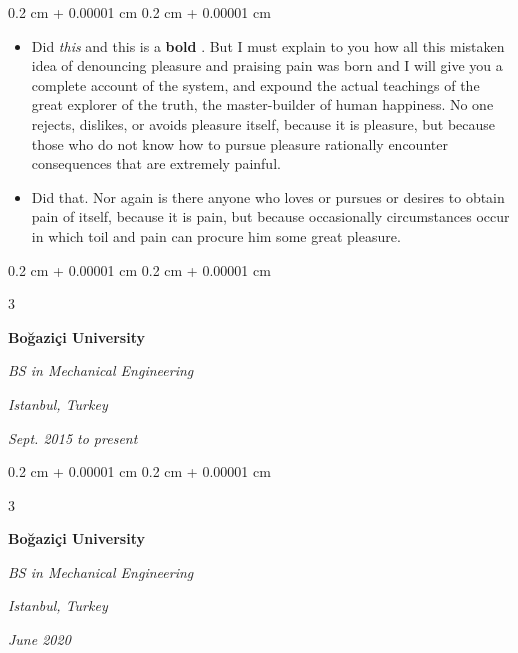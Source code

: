 \documentclass[10pt, letterpaper]{article}
\newenvironment{highlights}{
    \begin{itemize}[
        topsep=0.10 cm,
        parsep=0.10 cm,
        partopsep=0pt,
        itemsep=0pt,
        leftmargin=0.4 cm + 10pt + 0.6 cm
    ]
}{
    \end{itemize}
} %
\newenvironment{onecolentry}{
    \begin{adjustwidth}{
        0.2 cm + 0.00001 cm
    }{
        0.2 cm + 0.00001 cm
    }
}{
    \end{adjustwidth}
} %
\newenvironment{threecolentry}[3][]{
    \onecolentry
    \def\thirdColumn{#3}
    \setcolumnwidth{0.6 cm, \fill, 4.5 cm}
    \begin{paracol}{3}
    #2 \switchcolumn
}{
    \switchcolumn \raggedleft \thirdColumn
    \end{paracol}
    \endonecolentry
} %
\let\hrefWithoutArrow\href
\renewcommand{\href}[2]{\hrefWithoutArrow{#1}{\mbox{\ifthenelse{\equal{#2}{}}{ }{#2 }\raisebox{.15ex}{\footnotesize \faExternalLink*}}}}
\begin{document}
        \vspace{0.10 cm-3px}
        \begin{onecolentry}
            \begin{highlights}
                \item Did \textit{this} and this is a \textbf{bold} \href{https://example.com}{link}. But I must explain to you how all this mistaken idea of denouncing pleasure and praising pain was born and I will give you a complete account of the system, and expound the actual teachings of the great explorer of the truth, the master-builder of human happiness. No one rejects, dislikes, or avoids pleasure itself, because it is pleasure, but because those who do not know how to pursue pleasure rationally encounter consequences that are extremely painful.
                \item Did that. Nor again is there anyone who loves or pursues or desires to obtain pain of itself, because it is pain, but because occasionally circumstances occur in which toil and pain can procure him some great pleasure.
            \end{highlights}
        \end{onecolentry}


        \vspace{0.2 cm-3px}

        \begin{threecolentry}{
            \vspace*{\fill}
            \textbullet
            \vspace*{3px}
            \vspace*{\fill}
        }{
        \textit{Istanbul, Turkey}    
            
        \textit{Sept. 2015 to present}}
            \textbf{Boğaziçi University}

            \textit{BS in Mechanical Engineering}
        \end{threecolentry}



        \vspace{0.2 cm-3px}

        \begin{threecolentry}{
            \vspace*{\fill}
            \textbullet
            \vspace*{3px}
            \vspace*{\fill}
        }{
        \textit{Istanbul, Turkey}    
            
        \textit{June 2020}}
            \textbf{Boğaziçi University}

            \textit{BS in Mechanical Engineering}
        \end{threecolentry}
\end{document}
